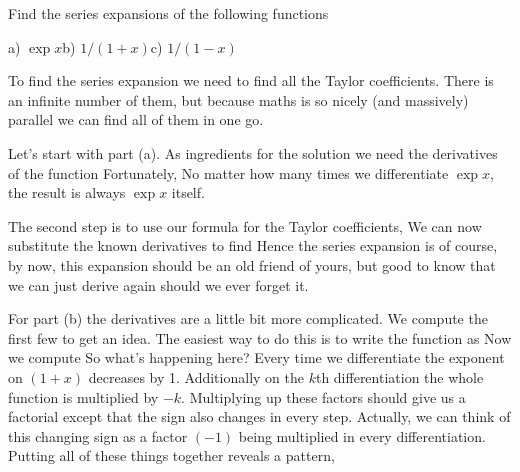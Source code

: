 \label{exGeneratingExSeries}
Find the series expansions of the following functions
\begin{center}
a) $\exp{x}$\qqq  b) $1/(1+x)$\qqq c) $1/(1-x)$ 
\end{center}

\solution
To find the series expansion we need to find all the Taylor coefficients. There is an infinite number of them, but because maths is so nicely (and massively) parallel we can find all of them in one go. 

Let's start with part (a). As ingredients for the solution we need the derivatives of the function 
Fortunately,
No matter how many times we differentiate $\exp{x}$, the result is always $\exp{x}$ itself. 

The second step is to use our formula for the Taylor coefficients,
We can now substitute the known derivatives
to find
Hence the series expansion is 
of course, by now, this expansion should be an old friend of yours, but good to know that we can just derive again should we ever forget it. 

For part (b) the derivatives are a little bit more complicated. We compute the first few to get an idea. The easiest way to do this is to write the function as 
Now we compute 
So what's happening here? Every time we differentiate the exponent on $(1+x)$ decreases by 1. Additionally on the $k$th differentiation the whole function is multiplied by $-k$. Multiplying up these factors should give us a factorial except that the sign also changes in every step. Actually, we can think of this changing sign as a factor $(-1)$ being multiplied in every differentiation. Putting all of these things together reveals a pattern,

